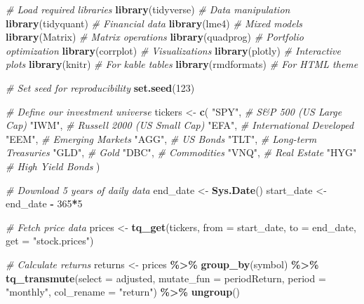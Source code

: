 \documentclass[
]{article}
\newenvironment{Shaded}{\begin{snugshade}}{\end{snugshade}}
\newcommand{\AttributeTok}[1]{\textcolor[rgb]{0.13,0.29,0.53}{#1}}
\newcommand{\CommentTok}[1]{\textcolor[rgb]{0.56,0.35,0.01}{\textit{#1}}}
\newcommand{\DecValTok}[1]{\textcolor[rgb]{0.00,0.00,0.81}{#1}}
\newcommand{\FunctionTok}[1]{\textcolor[rgb]{0.13,0.29,0.53}{\textbf{#1}}}
\newcommand{\NormalTok}[1]{#1}
\newcommand{\OtherTok}[1]{\textcolor[rgb]{0.56,0.35,0.01}{#1}}
\newcommand{\SpecialCharTok}[1]{\textcolor[rgb]{0.81,0.36,0.00}{\textbf{#1}}}
\newcommand{\StringTok}[1]{\textcolor[rgb]{0.31,0.60,0.02}{#1}}
\begin{document}
\begin{Shaded}
\begin{Highlighting}[]
\CommentTok{\# Load required libraries}
\FunctionTok{library}\NormalTok{(tidyverse)    }\CommentTok{\# Data manipulation}
\FunctionTok{library}\NormalTok{(tidyquant)    }\CommentTok{\# Financial data}
\FunctionTok{library}\NormalTok{(lme4)         }\CommentTok{\# Mixed models}
\FunctionTok{library}\NormalTok{(Matrix)       }\CommentTok{\# Matrix operations}
\FunctionTok{library}\NormalTok{(quadprog)     }\CommentTok{\# Portfolio optimization}
\FunctionTok{library}\NormalTok{(corrplot)     }\CommentTok{\# Visualizations}
\FunctionTok{library}\NormalTok{(plotly)       }\CommentTok{\# Interactive plots}
\FunctionTok{library}\NormalTok{(knitr)        }\CommentTok{\# For kable tables}
\FunctionTok{library}\NormalTok{(rmdformats)   }\CommentTok{\# For HTML theme}

\CommentTok{\# Set seed for reproducibility}
\FunctionTok{set.seed}\NormalTok{(}\DecValTok{123}\NormalTok{)}

\CommentTok{\# Define our investment universe}
\NormalTok{tickers }\OtherTok{\textless{}{-}} \FunctionTok{c}\NormalTok{(}
  \StringTok{"SPY"}\NormalTok{,  }\CommentTok{\# S\&P 500 (US Large Cap)}
  \StringTok{"IWM"}\NormalTok{,  }\CommentTok{\# Russell 2000 (US Small Cap)}
  \StringTok{"EFA"}\NormalTok{,  }\CommentTok{\# International Developed}
  \StringTok{"EEM"}\NormalTok{,  }\CommentTok{\# Emerging Markets}
  \StringTok{"AGG"}\NormalTok{,  }\CommentTok{\# US Bonds}
  \StringTok{"TLT"}\NormalTok{,  }\CommentTok{\# Long{-}term Treasuries}
  \StringTok{"GLD"}\NormalTok{,  }\CommentTok{\# Gold}
  \StringTok{"DBC"}\NormalTok{,  }\CommentTok{\# Commodities}
  \StringTok{"VNQ"}\NormalTok{,  }\CommentTok{\# Real Estate}
  \StringTok{"HYG"}   \CommentTok{\# High Yield Bonds}
\NormalTok{)}

\CommentTok{\# Download 5 years of daily data}
\NormalTok{end\_date }\OtherTok{\textless{}{-}} \FunctionTok{Sys.Date}\NormalTok{()}
\NormalTok{start\_date }\OtherTok{\textless{}{-}}\NormalTok{ end\_date }\SpecialCharTok{{-}} \DecValTok{365}\SpecialCharTok{*}\DecValTok{5}

\CommentTok{\# Fetch price data}
\NormalTok{prices }\OtherTok{\textless{}{-}} \FunctionTok{tq\_get}\NormalTok{(tickers, }\AttributeTok{from =}\NormalTok{ start\_date, }\AttributeTok{to =}\NormalTok{ end\_date, }\AttributeTok{get =} \StringTok{"stock.prices"}\NormalTok{)}

\CommentTok{\# Calculate returns}
\NormalTok{returns }\OtherTok{\textless{}{-}}\NormalTok{ prices }\SpecialCharTok{\%\textgreater{}\%}
  \FunctionTok{group\_by}\NormalTok{(symbol) }\SpecialCharTok{\%\textgreater{}\%}
  \FunctionTok{tq\_transmute}\NormalTok{(}\AttributeTok{select =}\NormalTok{ adjusted,}
               \AttributeTok{mutate\_fun =}\NormalTok{ periodReturn,}
               \AttributeTok{period =} \StringTok{"monthly"}\NormalTok{,}
               \AttributeTok{col\_rename =} \StringTok{"return"}\NormalTok{) }\SpecialCharTok{\%\textgreater{}\%}
  \FunctionTok{ungroup}\NormalTok{()}


\end{Highlighting}
\end{Shaded}
\end{document}
